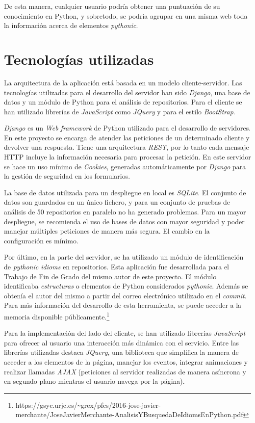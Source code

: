 \documentclass[a4paper, 12pt]{book}
\begin{document}
De esta manera, cualquier usuario podría obtener una puntuación de su conocimiento en Python, y sobretodo, se podría agrupar en una misma web toda la información acerca de elementos \textit{pythonic}.


\section{Tecnologías utilizadas}

La arquitectura de la aplicación está basada en un modelo cliente-servidor. Las tecnologías utilizadas para el desarrollo del servidor han sido \textit{Django}, una base de datos y un módulo de Python para el análisis de repositorios. Para el cliente se han utilizado librerías de \textit{JavaScript} como \textit{JQuery} y para el estilo \textit{BootStrap}.

\textit{Django} es un \textit{Web framework} de Python utilizado para el desarrollo de servidores. En este proyecto se encarga de atender las peticiones de un determinado cliente y devolver una respuesta. Tiene una arquitectura \textit{REST}, por lo tanto cada mensaje HTTP incluye la información necesaria para procesar la petición. En este servidor se hace un uso mínimo de \textit{Cookies}, generadas automáticamente por \textit{Django} para la gestión de seguridad en los formularios.

La base de datos utilizada para un despliegue en local es \textit{SQLite}. El conjunto de datos son guardados en un único fichero, y para un conjunto de pruebas de análisis de 50 repositorios en paralelo no ha generado problemas. Para un mayor despliegue, se recomienda el uso de bases de datos con mayor seguridad y poder manejar múltiples peticiones de manera más segura. El cambio en la configuración es mínimo.

Por último, en la parte del servidor, se ha utilizado un módulo de identificación de \textit{pythonic idioms} en repositorios. Esta aplicación fue desarrollada para el Trabajo de Fin de Grado del mismo autor de este proyecto. El módulo identificaba \textit{estructuras} o elementos de Python considerados \textit{pythonic}. Además se obtenía el autor del mismo a partir del correo electrónico utilizado en el \textit{commit}. Para más información del desarrollo de esta herramienta, se puede acceder a la memoria disponible públicamente.\footnote{https://gsyc.urjc.es/\texttt{\~{}}grex/pfcs/2016-jose-javier-merchante/JoseJavierMerchante-AnalisisYBusquedaDeIdiomsEnPython.pdf}

Para la implementación del lado del cliente, se han utilizado librerías \textit{JavaScript} para ofrecer al usuario una interacción más dinámica con el servicio. Entre las librerías utilizadas destaca \textit{JQuery}, una biblioteca que simplifica la manera de acceder a los elementos de la página, manejar los eventos, integrar animaciones y realizar llamadas \textit{AJAX} (peticiones al servidor realizadas de manera asíncrona y en segundo plano mientras el usuario navega por la página).
\end{document}
